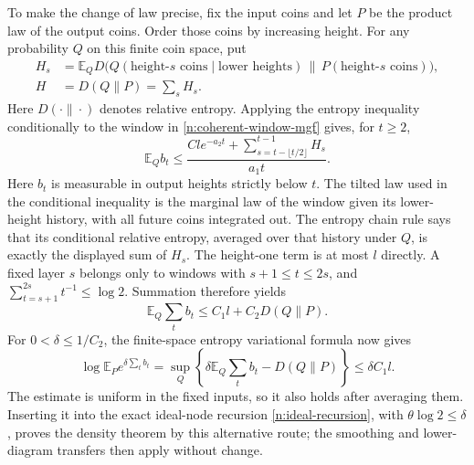 To make the change of law precise, fix the input coins and let $P$
be the product law of the output coins.  Order those coins by
increasing height.  For any probability $Q$ on this finite coin
space, put
\[
\begin{aligned}
 H_s&=\mathbb E_Q D\bigl(Q(\text{height-}s\text{ coins}\mid
           \text{lower heights})\,
          \|\,P(\text{height-}s\text{ coins})\bigr),\\
 H&=D(Q\|P)=\sum_sH_s.
\end{aligned}
\]
Here $D(\cdot\|\cdot)$ denotes relative entropy.  Applying the
entropy inequality conditionally to the window in
\eqref{n:coherent-window-mgf} gives, for $t\ge2$,
\[
 \mathbb E_Qb_t\le
 \frac{Cl e^{-a_2t}+
                  \sum_{s=t-\lfloor t/2\rfloor}^{t-1}H_s}{a_1t}.
\]
Here $b_t$ is measurable in output heights strictly below $t$.
The tilted law used in the conditional inequality is the marginal
law of the window given its lower-height history, with all future
coins integrated out.  The entropy chain rule says that its
conditional relative entropy, averaged over that history under $Q$,
is exactly the displayed sum of $H_s$.
The height-one term is at most $l$ directly.  A fixed layer $s$
belongs only to windows with $s+1\le t\le2s$, and
$\sum_{t=s+1}^{2s}t^{-1}\le\log2$.  Summation therefore yields
\begin{equation}\label{n:coherent-tilted-cycle-sum}
 \mathbb E_Q\sum_tb_t\le C_1l+C_2D(Q\|P).
\end{equation}
For $0<\delta\le1/C_2$, the finite-space entropy variational
formula now gives
\[
 \log\mathbb E_Pe^{\delta\sum_tb_t}
 =\sup_Q\left\{\delta\mathbb E_Q\sum_tb_t-D(Q\|P)\right\}
 \le\delta C_1l.
\]
The estimate is uniform in the fixed inputs, so it also holds after
averaging them.  Inserting it into the exact ideal-node recursion
\eqref{n:ideal-recursion}, with
$\theta\log2\le\delta$, proves the density theorem by this
alternative route; the smoothing and lower-diagram transfers then
apply without change.

